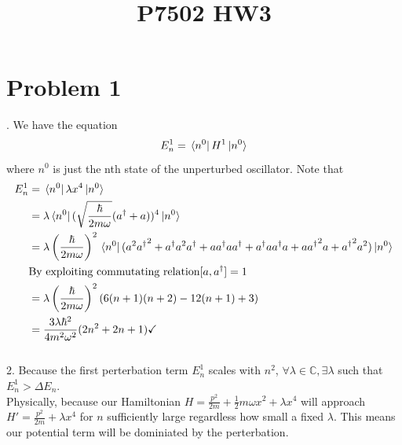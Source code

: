 \documentclass[10pt]{article}
\title{P7502 HW3}
\begin{document}
\maketitle

\section*{Problem 1}

.
We have the equation
\begin{equation}
	\label{1}
	E_n^1 = \bra*{n^0} H^1 \ket*{n^0}
\end{equation}
where $n^0$ is just the nth state of the unperturbed oscillator.
Note that
\begin{align*}
	E_n^1 & = \bra*{n^0}\lambda x^4 \ket*{n^0}                                                                                                                                                                               \\
	      & = \lambda \bra*{n^0}(\sqrt{\frac{ \hbar}{2 m \omega}} (a^\dagger + a))^4 \ket*{n^0}                                                                                                                              \\
	      & = \lambda \left(\dfrac{\hbar}{2 m \omega}\right)^2 \bra*{n^0}(a^2 {a^\dagger}^2 + a^\dagger a^2 a^\dagger+a a^\dagger a a^\dagger + a^\dagger a a^\dagger a + a {a^\dagger}^2 a + {a^\dagger}^2 a^2 ) \ket*{n^0} \\
	      & \text{By exploiting commutating relation} [a,a^\dag]=1                                                                                                                                                           \\
	      & = \lambda \left(\dfrac{\hbar}{2 m \omega}\right)^2 (6(n+1)(n+2)-12(n+1)+3)                                                                                                                                       \\
	      & = \dfrac{3 \lambda \hbar^2}{4 m^2 \omega^2} (2n^2 + 2n +1) \checkmark
\end{align*}
\\

2.
Because the first perterbation term $E_n^1$ scales with $n^2$, $\forall \lambda \in \mathbb{C}, \exists \lambda$ such that $E_n^1 > \Delta E_n$.\\
Physically, because our Hamiltonian $H = \frac{p^2}{2m} + \frac{1}{2} m \omega x^2 + \lambda x^4$ will approach $H' = \frac{p^2}{2m}  + \lambda x^4$ for $n$ sufficiently large regardless how small a fixed $\lambda$. This means our potential term will be dominiated by the perterbation.
\end{document}
